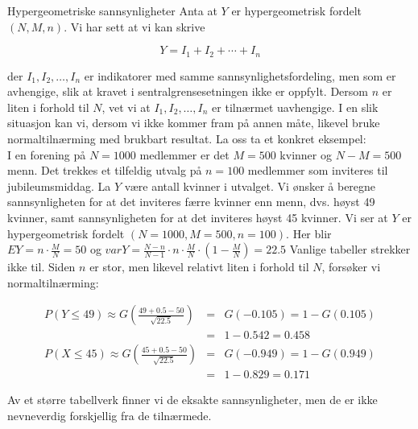 \begin{eksempel}{Hypergeometriske sannsynligheter}
Anta at $Y$ er hypergeometrisk fordelt $(N,M,n)$. Vi har sett at
vi kan skrive

\[   Y=I_1+I_2+\cdots +I_n \]

\noindent der $I_1, I_2, \ldots , I_n$ er indikatorer med samme
sannsynlighetsfordeling, men som er avhengige, slik at kravet i
sentralgrensesetningen ikke er oppfylt. Dersom $n$ er liten i
forhold til $N$, vet vi at $I_1, I_2, \ldots , I_n$ er tilnærmet
uavhengige. I en slik situasjon kan vi, dersom vi ikke kommer
fram på annen måte, likevel bruke normaltilnærming med brukbart
resultat. La oss ta et konkret eksempel: \\
I en forening på $N=1000$ medlemmer er det $M=500$ kvinner og $N-
M=500$ menn. Det trekkes et tilfeldig utvalg på $n=100$ medlemmer
som inviteres til jubileumsmiddag. La $Y$ være antall kvinner i
utvalget. Vi ønsker å beregne sannsynligheten for at det
inviteres færre kvinner enn menn, dvs. høyst 49 kvinner, samt
sannsynligheten for at det inviteres høyst 45 kvinner. Vi ser at
$Y$ er hypergeometrisk fordelt $(N=1000, M=500, n=100)$. Her blir
 $EY=n \cdot \frac{M}{N}=50$ og $varY=\frac{N-n}{N-1} \cdot n \cdot
    \frac{M}{N} \cdot (1-\frac{M}{N})=22.5$
Vanlige tabeller strekker ikke til. Siden $n$ er stor, men
likevel relativt liten i forhold til $N$, forsøker vi
normaltilnærming:

\begin{eqnarray*}
P(Y \leq 49) \approx G(\frac{49+0.5-50}{\sqrt{22.5}})&=&G(-0.105)=1-G(0.105)\\
                 &=&1-0.542=0.458 \\
P(X \leq 45) \approx G(\frac{45+0.5-50}{\sqrt{22.5}})&=&G(-0.949)=1-G(0.949)\\
                   &=&1-0.829=0.171
\end{eqnarray*}

\noindent Av et større tabellverk finner vi de eksakte sannsynligheter, men
de er ikke nevneverdig forskjellig fra de tilnærmede.
\end{eksempel}

